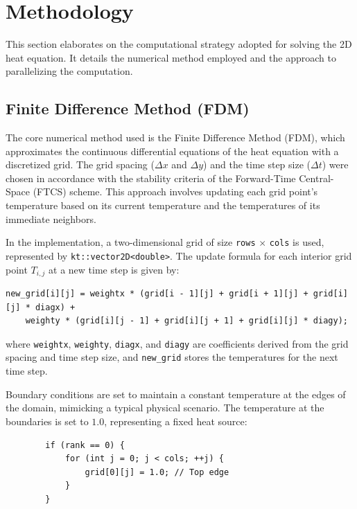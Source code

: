 \documentclass[11pt]{article}
\begin{document}
        \section{Methodology}

        This section elaborates on the computational strategy adopted for solving the 2D heat equation. It details the numerical method employed and the approach to parallelizing the computation.
        
        \subsection{Finite Difference Method (FDM)}
        
        The core numerical method used is the Finite Difference Method (FDM), which approximates the continuous differential equations of the heat equation with a discretized grid. The grid spacing ($\Delta x$ and $\Delta y$) and the time step size ($\Delta t$) were chosen in accordance with the stability criteria of the Forward-Time Central-Space (FTCS) scheme. This approach involves updating each grid point's temperature based on its current temperature and the temperatures of its immediate neighbors.
        
        In the implementation, a two-dimensional grid of size \texttt{rows} $\times$ \texttt{cols} is used, represented by \texttt{kt::vector2D<double>}. The update formula for each interior grid point $T_{i,j}$ at a new time step is given by:
        
        \begin{verbatim}
new_grid[i][j] = weightx * (grid[i - 1][j] + grid[i + 1][j] + grid[i][j] * diagx) +
    weighty * (grid[i][j - 1] + grid[i][j + 1] + grid[i][j] * diagy);
        \end{verbatim}
        
        where \texttt{weightx}, \texttt{weighty}, \texttt{diagx}, and \texttt{diagy} are coefficients derived from the grid spacing and time step size, and \texttt{new\_grid} stores the temperatures for the next time step.
        
        Boundary conditions are set to maintain a constant temperature at the edges of the domain, mimicking a typical physical scenario. The temperature at the boundaries is set to $1.0$, representing a fixed heat source:
        
        \begin{verbatim}
        if (rank == 0) {
            for (int j = 0; j < cols; ++j) {
                grid[0][j] = 1.0; // Top edge
            }
        }
        \end{verbatim}
        
\end{document}
